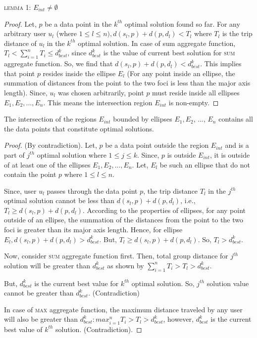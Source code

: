 \hspace{-3ex}\textsc{lemma} 1: \textit{$E_{int} \neq \emptyset $}

\begin{proof}
Let, $p$ be a data point in the $k^{th}$ optimal solution found so far. For any arbitrary user $u_l$ (where $1 \le l \le n),  d(s_l,p)+d(p,d_l)<T_l$ where $T_l$ is the trip distance of $u_l$ in the $k^{th}$ optimal solution. In case of sum aggregate function, $T_l < \sum_{i=1}^n T_i \le d_{best}^k$, since $d_{best}^k$ is the value of current best solution for \textsc{sum} aggregate function. So, we find that $d(s_l,p) + d(p,d_l) < d_{best}^k$. This implies that point $p$ resides inside the ellipse $E_l$ (For any point inside an ellipse, the summation of distances from the point to the two foci is less than the major axis length). Since, $u_l$ was chosen arbitrarily, point $p$ must reside inside all ellipses $E_1,E_2,...,E_n$. This means the intersection region $E_{int}$ is non-empty.
\end{proof}



\begin{theorem}
The intersection of the regions $E_{int}$ bounded by ellipses $E_1,E_2$, ..., $E_n$ contains all the data points that constitute optimal solutions.
\end{theorem}

\begin{proof}
(By contradiction). Let, $p$ be a data point outside the region $E_{int}$ and is a part of $j^{th}$ optimal solution where $1 \le j \le k$. Since, $p$ is outside $E_{int}$, it is outside of at least one of the ellipses $E_1,E_2,...,E_n$. Let, $E_l$ be such an ellipse that do not contain the point $p$ where $1 \le l \le n$.

Since, user $u_l$ passes through the data point $p$, the trip distance $T_l$ in the $j^{th}$ optimal solution cannot be less than $d(s_l,p)+d(p,d_l)$, i.e., $T_l \geq d(s_l,p)+d(p,d_l)$. According to the properties of ellipses, for any point outside of an ellipse, the summation of the distances from the point to the two foci is greater than its major axis length. Hence, for ellipse $E_l,  d(s_l,p)+d(p,d_l )>d_{best}^k$. But, $T_l \geq d(s_l,p)+d(p,d_l)$. So, $T_l>d_{best}^k$.

Now, consider \textsc{sum} aggregate function first. Then, total group distance for $j^{th}$ solution will be greater than $d_{best}^k$ as shown by
$\sum_{i=1}^n T_i > T_l > d_{best}^k.$

But, $d_{best}^k$ is the current best value for $k^{th}$ optimal solution. So, $j^{th}$ solution value cannot be greater than $d_{best}^k$. (Contradiction)

In case of \textsc{max} aggregate function, the maximum distance traveled by any user will also be greater than $d_{best}^k : max_{i=1}^n T_i > T_l > d_{best}^k $, however, $d_{best}^k$ is the current best value of $k^{th}$ solution. (Contradiction).
\end{proof}

